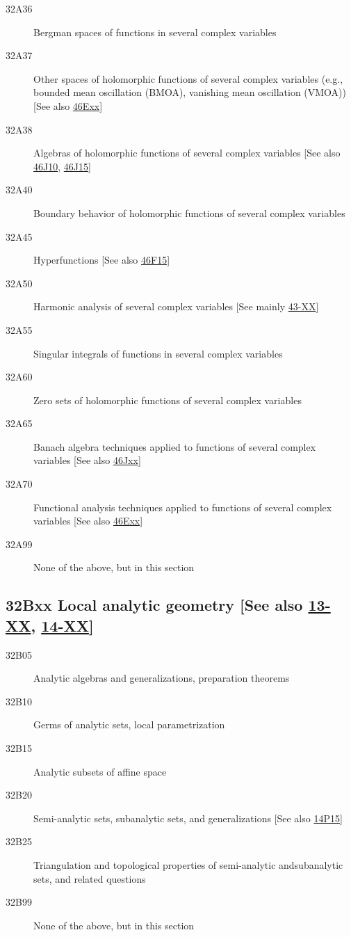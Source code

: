 \begin{description}
\item [32A36]\label{32A36} Bergman spaces of functions in several complex variables
\item [32A37]\label{32A37} Other spaces of holomorphic functions of several complex variables (e.g., bounded mean oscillation (BMOA), vanishing mean oscillation (VMOA)) [See also \hyperref[46Exx]{46Exx}]
\item [32A38]\label{32A38} Algebras of holomorphic functions of several complex variables [See also \hyperref[46J10]{46J10}, \hyperref[46J15]{46J15}]
\item [32A40]\label{32A40} Boundary behavior of holomorphic functions of several complex variables
\item [32A45]\label{32A45} Hyperfunctions [See also \hyperref[46F15]{46F15}]
\item [32A50]\label{32A50} Harmonic analysis of several complex variables [See mainly \hyperref[43-XX]{43-XX}]
\item [32A55]\label{32A55} Singular integrals of functions in several complex variables
\item [32A60]\label{32A60} Zero sets of holomorphic functions of several complex variables
\item [32A65]\label{32A65} Banach algebra techniques applied to functions of several complex variables [See also \hyperref[46Jxx]{46Jxx}]
\item [32A70]\label{32A70} Functional analysis techniques applied to functions of several complex variables [See also \hyperref[46Exx]{46Exx}]
\item [32A99]\label{32A99} None of the above, but in this section
\end{description}
\subsection*{32Bxx  Local analytic geometry [See also \hyperref[13-XX]{13-XX}, \hyperref[14-XX]{14-XX}] }\label{32Bxx}
\begin{description}  
\item [32B05]\label{32B05} Analytic algebras and generalizations, preparation theorems
\item [32B10]\label{32B10} Germs of analytic sets, local parametrization
\item [32B15]\label{32B15} Analytic subsets of affine space
\item [32B20]\label{32B20} Semi-analytic sets, subanalytic sets, and generalizations [See also \hyperref[14P15]{14P15}]
\item [32B25]\label{32B25} Triangulation and topological properties of semi-analytic andsubanalytic sets, and related questions
\item [32B99]\label{32B99} None of the above, but in this section
\end{description}
